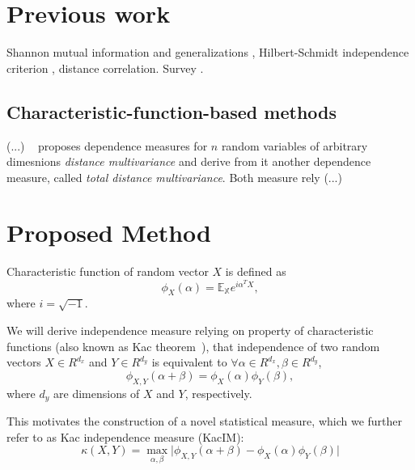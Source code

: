 \documentclass{article}
\begin{document}
\section{Previous work}
\label{section:previous_work}
Shannon mutual information \cite{?} and generalizations \cite{?},  Hilbert-Schmidt independence criterion \cite{?}, distance correlation\cite{?}. Survey \cite{?}.

\subsection{Characteristic-function-based methods}
\label{section:previous_work_cf}
\cite{Feuerverger} (...) 
~\cite{Bottcher} proposes dependence measures for $n$ random variables of arbitrary dimesnions \textit{distance multivariance} and derive from it another dependence measure, called  \textit{total distance multivariance}. Both measure rely (...)
\cite{Belu2012MultivariateMO}
\section{Proposed Method}
\label{section:proposed_method}
Characteristic function of random vector $X$ is defined as 
\begin{equation}
    \label{eq:characteristic_function}
    \phi_{X}(\alpha) = \mathbb{E_{X}} e^{i\alpha^{T}X}, 
\end{equation}
where $i=\sqrt{-1}$.

We will derive independence measure relying on property of characteristic functions (also known as Kac theorem~\cite{KacTheorem}), that independence of two random vectors $X \in R^{d_{x}}$ and $Y \in R^{d_{y}}$ is equivalent to $\forall \alpha \in R^{d_x}, \beta \in R^{d_y} $, \begin{equation}
\phi_{X,Y}(\alpha + \beta) = \phi_{X}(\alpha) \phi_{Y}(\beta),
\end{equation}
where $d_{y}$ are dimensions of $X$ and $Y$, respectively.

\noindent This motivates the construction of a novel statistical measure, which we further refer to as Kac independence measure (KacIM):
\begin{equation}
\label{eq:kim}
    \kappa(X,Y) = \max_{\alpha, \beta} \vert \phi_{X,Y}(\alpha + \beta)  -\phi_{X}(\alpha) \phi_{Y}(\beta) \vert
\end{equation}
\end{document}
